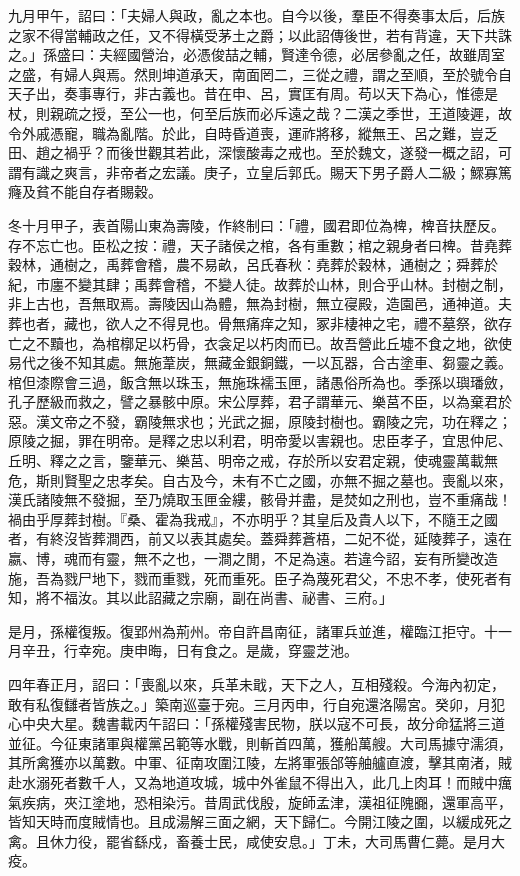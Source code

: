 \begin{pinyinscope}
九月甲午，詔曰：「夫婦人與政，亂之本也。自今以後，羣臣不得奏事太后，后族之家不得當輔政之任，又不得橫受茅土之爵；以此詔傳後世，若有背違，天下共誅之。」孫盛曰：夫經國營治，必憑俊喆之輔，賢達令德，必居參亂之任，故雖周室之盛，有婦人與焉。然則坤道承天，南面罔二，三從之禮，謂之至順，至於號令自天子出，奏事專行，非古義也。昔在申、呂，實匡有周。苟以天下為心，惟德是杖，則親疏之授，至公一也，何至后族而必斥遠之哉？二漢之季世，王道陵遲，故令外戚憑寵，職為亂階。於此，自時昏道喪，運祚將移，縱無王、呂之難，豈乏田、趙之禍乎？而後世觀其若此，深懷酸毒之戒也。至於魏文，遂發一概之詔，可謂有識之爽言，非帝者之宏議。庚子，立皇后郭氏。賜天下男子爵人二級；鰥寡篤癃及貧不能自存者賜穀。

冬十月甲子，表首陽山東為壽陵，作終制曰：「禮，國君即位為椑，椑音扶歷反。存不忘亡也。臣松之按：禮，天子諸侯之棺，各有重數；棺之親身者曰椑。昔堯葬穀林，通樹之，禹葬會稽，農不易畝，呂氏春秋：堯葬於穀林，通樹之；舜葬於紀，市廛不變其肆；禹葬會稽，不變人徒。故葬於山林，則合乎山林。封樹之制，非上古也，吾無取焉。壽陵因山為體，無為封樹，無立寑殿，造園邑，通神道。夫葬也者，藏也，欲人之不得見也。骨無痛痒之知，冢非棲神之宅，禮不墓祭，欲存亡之不黷也，為棺槨足以朽骨，衣衾足以朽肉而已。故吾營此丘墟不食之地，欲使易代之後不知其處。無施葦炭，無藏金銀銅鐵，一以瓦器，合古塗車、芻靈之義。棺但漆際會三過，飯含無以珠玉，無施珠襦玉匣，諸愚俗所為也。季孫以璵璠斂，孔子歷級而救之，譬之暴骸中原。宋公厚葬，君子謂華元、樂莒不臣，以為棄君於惡。漢文帝之不發，霸陵無求也；光武之掘，原陵封樹也。霸陵之完，功在釋之；原陵之掘，罪在明帝。是釋之忠以利君，明帝愛以害親也。忠臣孝子，宜思仲尼、丘明、釋之之言，鑒華元、樂莒、明帝之戒，存於所以安君定親，使魂靈萬載無危，斯則賢聖之忠孝矣。自古及今，未有不亡之國，亦無不掘之墓也。喪亂以來，漢氏諸陵無不發掘，至乃燒取玉匣金縷，骸骨并盡，是焚如之刑也，豈不重痛哉！禍由乎厚葬封樹。『桑、霍為我戒』，不亦明乎？其皇后及貴人以下，不隨王之國者，有終沒皆葬澗西，前又以表其處矣。蓋舜葬蒼梧，二妃不從，延陵葬子，遠在嬴、博，魂而有靈，無不之也，一澗之閒，不足為遠。若違今詔，妄有所變改造施，吾為戮尸地下，戮而重戮，死而重死。臣子為蔑死君父，不忠不孝，使死者有知，將不福汝。其以此詔藏之宗廟，副在尚書、祕書、三府。」

是月，孫權復叛。復郢州為荊州。帝自許昌南征，諸軍兵並進，權臨江拒守。十一月辛丑，行幸宛。庚申晦，日有食之。是歲，穿靈芝池。

四年春正月，詔曰：「喪亂以來，兵革未戢，天下之人，互相殘殺。今海內初定，敢有私復讎者皆族之。」築南巡臺于宛。三月丙申，行自宛還洛陽宮。癸卯，月犯心中央大星。魏書載丙午詔曰：「孫權殘害民物，朕以寇不可長，故分命猛將三道並征。今征東諸軍與權黨呂範等水戰，則斬首四萬，獲船萬艘。大司馬據守濡須，其所禽獲亦以萬數。中軍、征南攻圍江陵，左將軍張郃等舳艫直渡，擊其南渚，賊赴水溺死者數千人，又為地道攻城，城中外雀鼠不得出入，此几上肉耳！而賊中癘氣疾病，夾江塗地，恐相染污。昔周武伐殷，旋師孟津，漢祖征隗嚻，還軍高平，皆知天時而度賊情也。且成湯解三面之網，天下歸仁。今開江陵之圍，以緩成死之禽。且休力役，罷省繇戍，畜養士民，咸使安息。」丁未，大司馬曹仁薨。是月大疫。


\end{pinyinscope}
